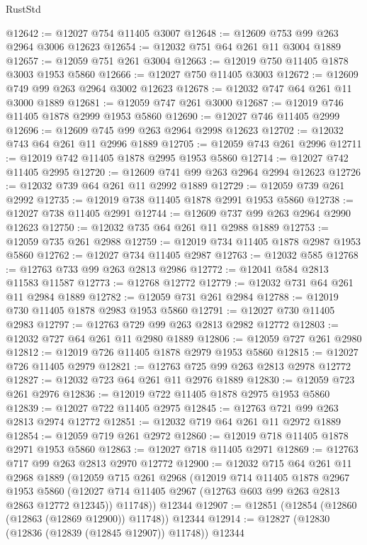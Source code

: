 \begin{lexlean}{RustStd}
\begin{coremodule}
@12642 := @12027 @754 @11405 @3007
@12648 := @12609 @753 @99 @263 @2964 @3006 @12623
@12654 := @12032 @751 @64 @261 @11 @3004 @1889
@12657 := @12059 @751 @261 @3004
@12663 := @12019 @750 @11405 @1878 @3003 @1953 @5860
@12666 := @12027 @750 @11405 @3003
@12672 := @12609 @749 @99 @263 @2964 @3002 @12623
@12678 := @12032 @747 @64 @261 @11 @3000 @1889
@12681 := @12059 @747 @261 @3000
@12687 := @12019 @746 @11405 @1878 @2999 @1953 @5860
@12690 := @12027 @746 @11405 @2999
@12696 := @12609 @745 @99 @263 @2964 @2998 @12623
@12702 := @12032 @743 @64 @261 @11 @2996 @1889
@12705 := @12059 @743 @261 @2996
@12711 := @12019 @742 @11405 @1878 @2995 @1953 @5860
@12714 := @12027 @742 @11405 @2995
@12720 := @12609 @741 @99 @263 @2964 @2994 @12623
@12726 := @12032 @739 @64 @261 @11 @2992 @1889
@12729 := @12059 @739 @261 @2992
@12735 := @12019 @738 @11405 @1878 @2991 @1953 @5860
@12738 := @12027 @738 @11405 @2991
@12744 := @12609 @737 @99 @263 @2964 @2990 @12623
@12750 := @12032 @735 @64 @261 @11 @2988 @1889
@12753 := @12059 @735 @261 @2988
@12759 := @12019 @734 @11405 @1878 @2987 @1953 @5860
@12762 := @12027 @734 @11405 @2987
@12763 := @12032 @585
@12768 := @12763 @733 @99 @263 @2813 @2986
@12772 := @12041 @584 @2813 @11583 @11587
@12773 := @12768 @12772
@12779 := @12032 @731 @64 @261 @11 @2984 @1889
@12782 := @12059 @731 @261 @2984
@12788 := @12019 @730 @11405 @1878 @2983 @1953 @5860
@12791 := @12027 @730 @11405 @2983
@12797 := @12763 @729 @99 @263 @2813 @2982 @12772
@12803 := @12032 @727 @64 @261 @11 @2980 @1889
@12806 := @12059 @727 @261 @2980
@12812 := @12019 @726 @11405 @1878 @2979 @1953 @5860
@12815 := @12027 @726 @11405 @2979
@12821 := @12763 @725 @99 @263 @2813 @2978 @12772
@12827 := @12032 @723 @64 @261 @11 @2976 @1889
@12830 := @12059 @723 @261 @2976
@12836 := @12019 @722 @11405 @1878 @2975 @1953 @5860
@12839 := @12027 @722 @11405 @2975
@12845 := @12763 @721 @99 @263 @2813 @2974 @12772
@12851 := @12032 @719 @64 @261 @11 @2972 @1889
@12854 := @12059 @719 @261 @2972
@12860 := @12019 @718 @11405 @1878 @2971 @1953 @5860
@12863 := @12027 @718 @11405 @2971
@12869 := @12763 @717 @99 @263 @2813 @2970 @12772
@12900 := @12032
    @715
    @64
    @261
    @11
    @2968
    @1889
    (@12059
      @715
      @261
      @2968
      (@12019
        @714
        @11405
        @1878
        @2967
        @1953
        @5860
        (@12027 @714 @11405 @2967 (@12763 @603 @99 @263 @2813 @2863 @12772 @12345))
        @11748))
    @12344
@12907 := @12851 (@12854 (@12860 (@12863 (@12869 @12900)) @11748)) @12344
@12914 := @12827 (@12830 (@12836 (@12839 (@12845 @12907)) @11748)) @12344

\end{coremodule}
\end{lexlean}
